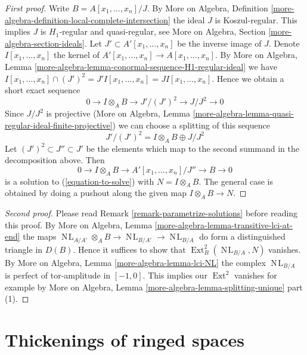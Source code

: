 \documentclass{stacks-project}
\theoremstyle{plain}
\theoremstyle{definition}
\theoremstyle{remark}
\numberwithin{equation}{subsection}
\def\Ext{\mathop{\mathrm{Ext}}\nolimits}
\def\NL{\mathop{N\!L}\nolimits}
\begin{document}
\begin{proof}[First proof]
Write $B = A[x_1, \ldots, x_n]/J$. By More on Algebra, Definition
\ref{more-algebra-definition-local-complete-intersection}
the ideal $J$ is Koszul-regular. This implies $J$ is $H_1$-regular and
quasi-regular, see More on Algebra, Section \ref{more-algebra-section-ideals}.
Let $J' \subset A'[x_1, \ldots, x_n]$
be the inverse image of $J$. Denote $I[x_1, \ldots, x_n]$ the
kernel of $A'[x_1, \ldots, x_n] \to A[x_1, \ldots, x_n]$.
By More on Algebra, Lemma
\ref{more-algebra-lemma-conormal-sequence-H1-regular-ideal} we have
$I[x_1, \ldots, x_n] \cap (J')^2 = J'I[x_1, \ldots, x_n] =
JI[x_1, \ldots, x_n]$. Hence we obtain a short exact sequence
$$
0 \to I \otimes_A B \to J'/(J')^2 \to J/J^2 \to 0
$$
Since $J/J^2$ is projective (More on Algebra, Lemma
\ref{more-algebra-lemma-quasi-regular-ideal-finite-projective})
we can choose a splitting of this sequence
$$
J'/(J')^2 = I \otimes_A B \oplus J/J^2 
$$
Let $(J')^2 \subset J'' \subset J'$ be the elements which map to the
second summand in the decomposition above. Then
$$
0 \to I \otimes_A B \to A'[x_1, \ldots, x_n]/J'' \to B \to 0
$$
is a solution to (\ref{equation-to-solve}) with $N = I \otimes_A B$.
The general case is obtained by doing a pushout along the given
map $I \otimes_A B \to N$.
\end{proof}

\begin{proof}[Second proof]
Please read Remark \ref{remark-parametrize-solutions}
before reading this proof. By
More on Algebra, Lemma \ref{more-algebra-lemma-transitive-lci-at-end}
the maps $\NL_{A/A'} \otimes_A B \to \NL_{B/A'} \to \NL_{B/A}$
do form a distinguished triangle in $D(B)$.
Hence it suffices to show that $\Ext^2_B(\NL_{B/A}, N)$ vanishes.
By More on Algebra, Lemma \ref{more-algebra-lemma-lci-NL}
the complex $\NL_{B/A}$ is perfect of tor-amplitude in
$[-1, 0]$. This implies our $\Ext^2$ vanishes for example
by More on Algebra, Lemma \ref{more-algebra-lemma-splitting-unique} part (1).
\end{proof}







\section{Thickenings of ringed spaces}
\label{section-thickenings-spaces}
\end{document}
